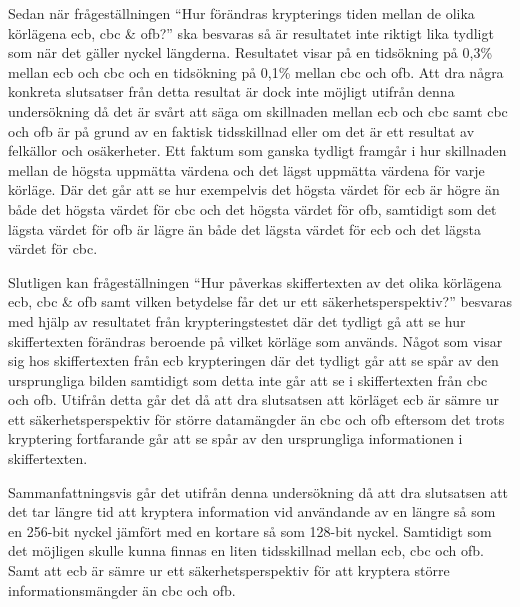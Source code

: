 Sedan när frågeställningen “Hur förändras krypterings tiden mellan de olika körlägena \acrshort{ecb}, \acrshort{cbc} \& \acrshort{ofb}?” ska besvaras så är resultatet inte
riktigt lika tydligt som när det gäller nyckel längderna. Resultatet visar på en tidsökning på 0,3\% mellan \acrshort{ecb} och \acrshort{cbc} och en tidsökning på 0,1\% mellan \acrshort{cbc} och
\acrshort{ofb}. Att dra några konkreta slutsatser från detta resultat är dock inte möjligt utifrån denna undersökning då det är svårt att säga om skillnaden mellan \acrshort{ecb} och \acrshort{cbc} samt
\acrshort{cbc} och \acrshort{ofb} är på grund av en faktisk tidsskillnad eller om det är ett resultat av felkällor och osäkerheter. Ett faktum som ganska tydligt framgår i hur
skillnaden mellan de högsta uppmätta värdena och det lägst uppmätta värdena för varje körläge. Där det går att se hur
exempelvis det högsta värdet för \acrshort{ecb} är högre än både det högsta värdet för \acrshort{cbc} och det högsta värdet för \acrshort{ofb}, samtidigt som det lägsta värdet för
\acrshort{ofb} är lägre än både det lägsta värdet för \acrshort{ecb} och det lägsta värdet för \acrshort{cbc}.

Slutligen kan frågeställningen “Hur påverkas skiffertexten av det olika körlägena \acrshort{ecb}, \acrshort{cbc} \& \acrshort{ofb} samt vilken betydelse får det ur ett säkerhetsperspektiv?”
besvaras med hjälp av resultatet från krypteringstestet där det tydligt gå att se hur skiffertexten förändras beroende på vilket körläge som används. Något som visar sig hos skiffertexten
från \acrshort{ecb} krypteringen där det tydligt går att se spår av den ursprungliga bilden samtidigt som detta inte går att se i skiffertexten från \acrshort{cbc} och \acrshort{ofb}. Utifrån detta går det då att dra slutsatsen
att körläget \acrshort{ecb} är sämre ur ett säkerhetsperspektiv för större datamängder än \acrshort{cbc} och \acrshort{ofb} eftersom det trots kryptering fortfarande går att se spår av den ursprungliga
informationen i skiffertexten.

Sammanfattningsvis går det utifrån denna undersökning då att dra slutsatsen att det tar längre tid att kryptera information vid användande av en längre så som en 256-bit nyckel jämfört med en kortare så som 128-bit nyckel. Samtidigt
som det möjligen skulle kunna finnas en liten tidsskillnad mellan \acrshort{ecb}, \acrshort{cbc} och \acrshort{ofb}. Samt att \acrshort{ecb} är sämre ur ett säkerhetsperspektiv för att kryptera större informationsmängder än
\acrshort{cbc} och \acrshort{ofb}.

